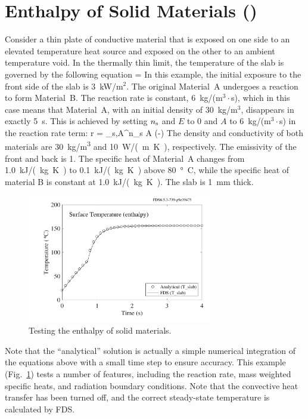 \documentclass[11pt]{book}
\begin{document}
\section{Enthalpy of Solid Materials (\texorpdfstring{}{enthalpy})}
\label{enthalpy}

Consider a thin plate of conductive material that is exposed on one side to an elevated temperature heat source and exposed on the other to an ambient temperature void. In the thermally thin limit, the temperature of the slab is governed by the following equation
\be
    = 
\ee
In this example, the initial exposure to the front side of the slab is 3~kW/m$^2$. The original Material~A undergoes a reaction to form Material~B.  The reaction rate is constant, 6~kg/(m$^3\cdot$s), which in this case means that Material~A, with an initial density of 30~kg/m$^3$, disappears in exactly 5~s. This is achieved by setting $n_{\rm s}$ and $E$ to 0 and $A$ to 6~kg/(m$^3\cdot$s) in the reaction rate term:
\be
    r = \rho_{s,A}^{n_{\rm s}} A \; \exp \left(-\right)
\ee
The density and conductivity of both materials are 30~\si{kg/m^3} and 10~\si{W/(m.K)}, respectively. The emissivity of the front and back is 1.  The specific heat of Material~A changes from 1.0~\si{kJ/(kg.K)} to 0.1~\si{kJ/(kg.K)} above 80~\si{\degree C}, while the specific heat of material B is constant at 1.0~\si{kJ/(kg.K)}. The slab is 1~mm thick.
\begin{figure}[!htb]
\centering
\includegraphics[height=2.2in]{SCRIPT_FIGURES/enthalpy}
\caption[The  test case]{Testing the enthalpy of solid materials.}
\label{fig:solid_phase_enthalpy}
\end{figure}
Note that the ``analytical'' solution is actually a simple numerical integration of the equations above with a small time step to ensure accuracy. This example (Fig.~\ref{fig:solid_phase_enthalpy}) tests a number of features, including the reaction rate, mass weighted specific heats, and radiation boundary conditions. Note that the convective heat transfer has been turned off, and the correct steady-state temperature is calculated by FDS.
\end{document}

